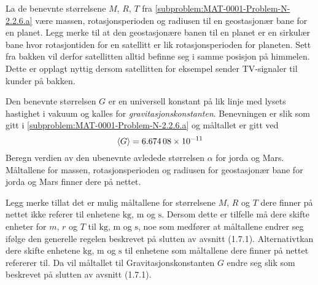 \documentclass[a4paper,11pt]{article}
\begin{document}
    \begin{subproblem}
        La de benevnte størrelsene $M$, $R$, $T$ fra \cref{subproblem:MAT-0001-Problem-N-2.2.6.a} være
        massen, rotasjonsperioden og radiusen til en geostasjonær bane for en
        planet. Legg merke til at den geostasjonære banen til en planet er en
        sirkulær bane hvor rotasjontiden for en satellitt er lik
        rotasjonsperioden for planeten. Sett fra bakken vil derfor satellitten
        alltid befinne seg i samme posisjon på himmelen.  Dette er opplagt
        nyttig dersom satellitten for eksempel sender TV-signaler til kunder på
        bakken.

        Den benevnte størrelsen $G$ er en universell konstant på lik linje med
        lysets hastighet i vakuum og kalles for \emph{gravitasjonskonstanten}.
        Benevningen er slik som gitt i \cref{subproblem:MAT-0001-Problem-N-2.2.6.a} og måltallet er gitt ved
        \begin{equation*}
          \langle G\rangle = \SI{6.67408e-11}.
        \end{equation*}
        Beregn verdien av den ubenevnte avledede størrelsen $\alpha$ for jorda
        og Mars. Måltallene for massen, rotasjonsperioden og radiusen for
        geostasjonær bane for jorda og Mars finner dere på nettet.

        Legg merke tillat det er mulig måltallene for størrelsene $M$, $R$ og
        $T$ dere finner på nettet ikke referer til enhetene $\si{\kg}$,
        $\si{\m}$ og $\si{\s}$. Dersom dette er tilfelle må dere skifte enheter
        for $m$, $r$ og $T$ til $\si{\kg}$, $\si{\m}$ og $\si{\s}$, noe som
        medfører at måltallene endrer seg ifølge den generelle regelen beskrevet
        på slutten av avsnitt (\textcolor{\UiTnumbercolor}{1}.\textcolor{\UiTnumbercolor}{7}.\textcolor{\UiTnumbercolor}{1}). Alternativtkan dere skifte
        enhetene $\si{\kg}$, $\si{\m}$ og $\si{\s}$ til enhetene som måltallene
        dere finner på nettet refererer til. Da vil måltallet til
        Gravitasjonskonstanten $G$ endre seg slik som beskrevet på slutten av
        avsnitt (\textcolor{\UiTnumbercolor}{1}.\textcolor{\UiTnumbercolor}{7}.\textcolor{\UiTnumbercolor}{1}).
    \end{subproblem}
    
\end{document}
